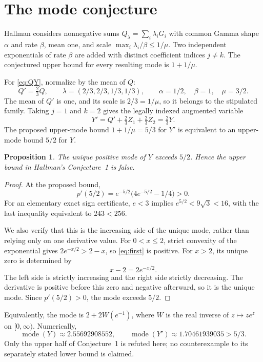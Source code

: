 \documentclass[11pt]{article}
\newtheorem{proposition}[theorem]{Proposition}
\theoremstyle{definition}
\begin{document}
\section{The mode conjecture}
Hallman \cite[Theorem~2 and Conjecture~1]{Hallman2024} considers nonnegative sums $Q_\lambda=\sum_i\lambda_iG_i$ with common Gamma shape $\alpha$ and rate $\beta$, mean one, and scale $\max_i\lambda_i/\beta\le1/\mu$. Two independent exponentials of rate $\beta$ are added with distinct coefficient indices $j\ne k$. The conjectured upper bound for every resulting mode is $1+1/\mu$.

For \eqref{eq:QY}, normalize by the mean of $Q$:
\[
 Q'=\tfrac23Q,
 \qquad \lambda=(2/3,2/3,1/3,1/3),
 \qquad \alpha=1/2,\quad\beta=1,\quad\mu=3/2.
\]
The mean of $Q'$ is one, and its scale is $2/3=1/\mu$, so it belongs to the stipulated family. Taking $j=1$ and $k=2$ gives the legally indexed augmented variable
\[
 Y'=Q'+\tfrac23 Z_1+\tfrac23 Z_2=\tfrac23Y.
\]
The proposed upper-mode bound $1+1/\mu=5/3$ for $Y'$ is equivalent to an upper-mode bound $5/2$ for $Y$.

\begin{proposition}
The unique positive mode of $Y$ exceeds $5/2$. Hence the upper bound in Hallman's Conjecture~1 is false.
\end{proposition}
\begin{proof}
At the proposed bound,
\[
 p'(5/2)=e^{-5/2}\bigl(4e^{-5/2}-1/4\bigr)>0.
\]
For an elementary exact sign certificate, $e<3$ implies $e^{5/2}<9\sqrt3<16$, with the last inequality equivalent to $243<256$.

We also verify that this is the increasing side of the unique mode, rather than relying only on one derivative value. For $0<x\le2$, strict convexity of the exponential gives $2e^{-x/2}>2-x$, so \eqref{eq:first} is positive. For $x>2$, its unique zero is determined by
\[
 x-2=2e^{-x/2}.
\]
The left side is strictly increasing and the right side strictly decreasing. The derivative is positive before this zero and negative afterward, so it is the unique mode. Since $p'(5/2)>0$, the mode exceeds $5/2$.
\end{proof}

Equivalently, the mode is $2+2W(e^{-1})$, where $W$ is the real inverse of $z\mapsto ze^z$ on $[0,\infty)$. Numerically,
\[
 \operatorname{mode}(Y)\approx2.55692908552,
 \qquad\operatorname{mode}(Y')\approx1.70461939035>5/3.
\]
Only the upper half of Conjecture~1 is refuted here; no counterexample to its separately stated lower bound is claimed.
\end{document}
